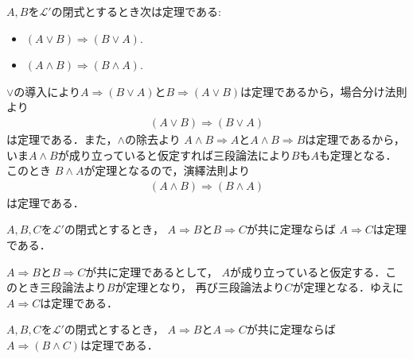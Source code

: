 	\begin{screen}
		\begin{logicalthm}
			$A,B$を$\mathcal{L}'$の閉式とするとき次は定理である:
			\begin{itemize}
				\item $(A \vee B) \Longrightarrow (B \vee A)$.
				\item $(A \wedge B) \Longrightarrow (B \wedge A)$.
			\end{itemize}
		\end{logicalthm}
	\end{screen}
	
	\begin{prf}
		$\vee$の導入により$A \Longrightarrow (B \vee A)$と$B \Longrightarrow (A \vee B)$は定理であるから，場合分け法則より
		\begin{align}
			(A \vee B) \Longrightarrow (B \vee A)
		\end{align}
		は定理である．また，$\wedge$の除去より
		$A \wedge B \Longrightarrow A$と$A \wedge B \Longrightarrow B$は定理であるから，
		いま$A \wedge B$が成り立っていると仮定すれば三段論法により$B$も$A$も定理となる．このとき
		$B \wedge A$が定理となるので，演繹法則より
		\begin{align}
			(A \wedge B) \Longrightarrow (B \wedge A)
		\end{align}
		は定理である．
		\QED
	\end{prf}
	
	\begin{screen}
		\begin{logicalthm}[含意の推移律]\label{logicalthm:transitive_law_of_implication}
			$A,B,C$を$\mathcal{L}'$の閉式とするとき，
			$A \Longrightarrow B$と$B \Longrightarrow C$が共に定理ならば
			$A \Longrightarrow C$は定理である．
		\end{logicalthm}
	\end{screen}
	
	\begin{prf}
		$A \Longrightarrow B$と$B \Longrightarrow C$が共に定理であるとして，
		$A$が成り立っていると仮定する．このとき三段論法より$B$が定理となり，
		再び三段論法より$C$が定理となる．ゆえに$A \Longrightarrow C$は定理である．
		\QED
	\end{prf}
	
	\begin{screen}
		\begin{logicalthm}[二式が同時に導かれるならその論理積が導かれる]
		\label{logicalthm:conjunction_of_consequences}
			$A,B,C$を$\mathcal{L}'$の閉式とするとき，
			$A \Longrightarrow B$と$A \Longrightarrow C$が共に定理ならば
			$A \Longrightarrow (B \wedge C)$は定理である．
		\end{logicalthm}
	\end{screen}
	
